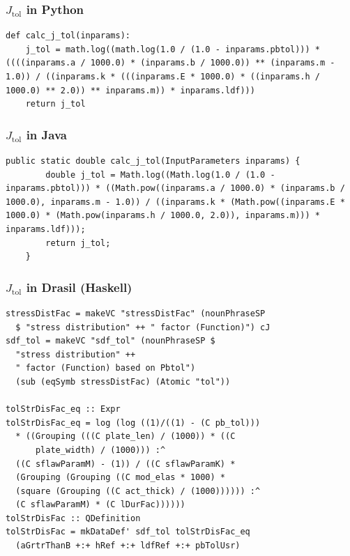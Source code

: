 \documentclass[t,12pt,numbers,fleqn]{beamer}
\begin{document}
\begin{frame}

\frametitle{$J_{\mbox{tol}}$ in Python}

\begin{lstlisting}
def calc_j_tol(inparams):
    j_tol = math.log((math.log(1.0 / (1.0 - inparams.pbtol))) * ((((inparams.a / 1000.0) * (inparams.b / 1000.0)) ** (inparams.m - 1.0)) / ((inparams.k * (((inparams.E * 1000.0) * ((inparams.h / 1000.0) ** 2.0)) ** inparams.m)) * inparams.ldf)))
    return j_tol
\end{lstlisting}
\end{frame}


\begin{frame}

\frametitle{$J_{\mbox{tol}}$ in Java}

\begin{lstlisting}
public static double calc_j_tol(InputParameters inparams) {
        double j_tol = Math.log((Math.log(1.0 / (1.0 - inparams.pbtol))) * ((Math.pow((inparams.a / 1000.0) * (inparams.b / 1000.0), inparams.m - 1.0)) / ((inparams.k * (Math.pow((inparams.E * 1000.0) * (Math.pow(inparams.h / 1000.0, 2.0)), inparams.m))) * inparams.ldf)));
        return j_tol;
    }
\end{lstlisting}
\end{frame}


\begin{frame}

\frametitle{$J_{\mbox{tol}}$ in Drasil (Haskell)}

\begin{lstlisting}
stressDistFac = makeVC "stressDistFac" (nounPhraseSP 
  $ "stress distribution" ++ " factor (Function)") cJ
sdf_tol = makeVC "sdf_tol" (nounPhraseSP $ 
  "stress distribution" ++
  " factor (Function) based on Pbtol") 
  (sub (eqSymb stressDistFac) (Atomic "tol"))

tolStrDisFac_eq :: Expr
tolStrDisFac_eq = log (log ((1)/((1) - (C pb_tol)))
  * ((Grouping (((C plate_len) / (1000)) * ((C
      plate_width) / (1000))) :^
  ((C sflawParamM) - (1)) / ((C sflawParamK) *
  (Grouping (Grouping ((C mod_elas * 1000) *
  (square (Grouping ((C act_thick) / (1000)))))) :^ 
  (C sflawParamM) * (C lDurFac))))))
tolStrDisFac :: QDefinition
tolStrDisFac = mkDataDef' sdf_tol tolStrDisFac_eq 
  (aGrtrThanB +:+ hRef +:+ ldfRef +:+ pbTolUsr)
\end{lstlisting}
\end{frame}
\end{document}
